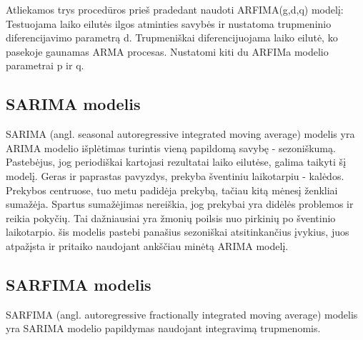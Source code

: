 \documentclass{VUMIFInfKursinis}
\begin{document}
Atliekamos trys procedūros prieš pradedant naudoti ARFIMA(g,d,q) modelį:
Testuojama laiko eilutės ilgos atminties savybės ir nustatoma trupmeninio diferencijavimo parametrą d.
Trupmeniškai diferencijuojama laiko eilutė, ko pasekoje gaunamas ARMA procesas.
Nustatomi kiti du ARFIMa modelio parametrai p ir q.

\subsection {SARIMA modelis}
SARIMA (angl. seasonal autoregressive integrated moving average) modelis yra ARIMA modelio išplėtimas turintis vieną papildomą savybę - sezoniškumą. 
Pastebėjus, jog periodiškai kartojasi rezultatai laiko eilutėse, galima taikyti šį modelį. Geras ir paprastas pavyzdys, prekyba šventiniu laikotarpiu - kalėdos.
Prekybos centruose, tuo metu padidėja prekybą, tačiau kitą mėnesį ženkliai sumažėja. Spartus sumažėjimas nereiškia, jog prekybai yra didėlės problemos ir reikia pokyčių.
Tai dažniausiai yra žmonių poilsis nuo pirkinių po šventinio laikotarpio. šis modelis pastebi panašius sezoniškai atsitinkančius įvykius, juos atpažįsta ir pritaiko naudojant
ankščiau minėtą ARIMA modelį. 

\subsection {SARFIMA modelis}
SARFIMA (angl. autoregressive fractionally integrated moving average) modelis yra SARIMA modelio papildymas naudojant integravimą trupmenomis.



\end{document}
